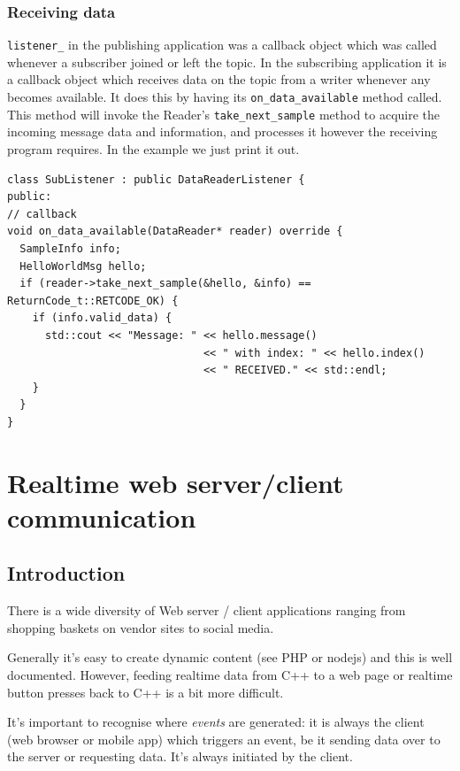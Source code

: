 \documentclass[12pt]{report}
\begin{document}
\subsection{Receiving data}
\texttt{listener\_} in the publishing application was a callback object which was
called whenever a subscriber joined or left the topic. In the subscribing application
it is a callback object which receives data on the topic from a writer
whenever any becomes available. It does this by having its
\texttt{on\_data\_available} method called. This method will
invoke the Reader's \texttt{take\_next\_sample} method to acquire the
incoming message data and information, and processes it
however the receiving program requires. In the example we just print it out.
\begin{verbatim}
class SubListener : public DataReaderListener {
public:
// callback
void on_data_available(DataReader* reader) override {
  SampleInfo info;
  HelloWorldMsg hello;
  if (reader->take_next_sample(&hello, &info) == ReturnCode_t::RETCODE_OK) {
    if (info.valid_data) {
      std::cout << "Message: " << hello.message()
                               << " with index: " << hello.index()
                               << " RECEIVED." << std::endl;
    }
  }
}
\end{verbatim}

\chapter{Realtime web server/client communication\label{webserver}}

\section{Introduction}

There is a wide diversity of Web server / client applications
ranging from shopping baskets on vendor sites to social
media.

Generally it's easy to create dynamic content (see PHP or nodejs) and this is well
documented. However, feeding realtime data from C++ to a web page or
realtime button presses back to C++ is a bit more difficult.

It's important to recognise where \textsl{events} are generated: it is
always the client (web browser or mobile app) which triggers an event,
be it sending data over to the server or requesting data. It's
always initiated by the client.
\end{document}
